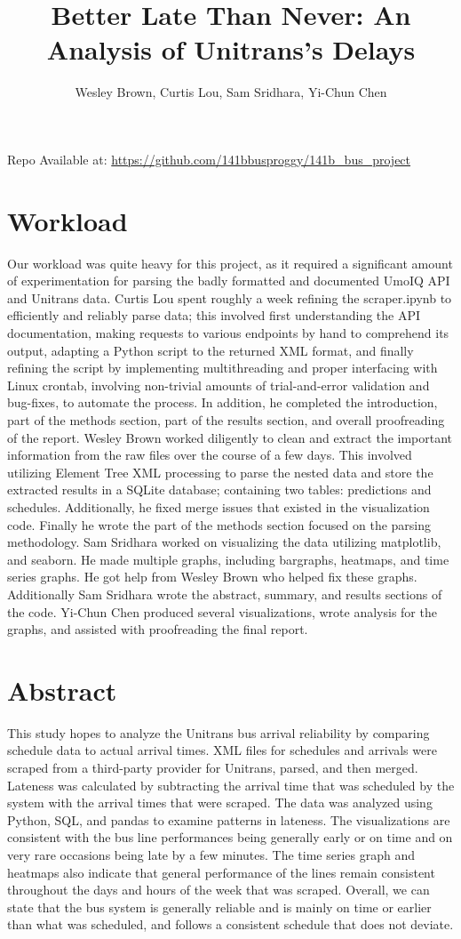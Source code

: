 \documentclass[]{article}
\title{Better Late Than Never: An Analysis of Unitrans's Delays}
\author{Wesley Brown, Curtis Lou, Sam Sridhara, Yi-Chun Chen}
\begin{document}
	\maketitle
	Repo Available at: \url{https://github.com/141bbusproggy/141b_bus_project}
	\pagebreak
	\section{Workload}
	Our workload was quite heavy for this project, as it required a significant amount of experimentation for parsing the badly formatted and documented UmoIQ API and Unitrans data. Curtis Lou spent roughly a week refining the scraper.ipynb to efficiently and reliably parse data; this involved first understanding the API documentation, making requests to various endpoints by hand to comprehend its output, adapting a Python script to the returned XML format, and finally refining the script by implementing multithreading and proper interfacing with Linux crontab, involving non-trivial amounts of trial-and-error validation and bug-fixes, to automate the process. In addition, he completed the introduction, part of the methods section, part of the results section, and overall  proofreading of the report. Wesley Brown worked diligently to clean and extract the important information from the raw files over the course of a few days. This involved utilizing Element Tree XML processing to parse the nested data and store the extracted results in a SQLite database; containing two tables: predictions and schedules. Additionally, he fixed merge issues that existed in the visualization code. Finally he wrote the part of the methods section focused on the parsing methodology. Sam Sridhara worked on visualizing the data utilizing matplotlib, and seaborn. He made multiple graphs, including bargraphs, heatmaps, and time series graphs. He got help from Wesley Brown who helped fix these graphs. Additionally Sam Sridhara wrote the abstract, summary, and results sections of the code. Yi-Chun Chen produced several visualizations, wrote analysis for the graphs, and assisted with proofreading the final report. 
	\section{Abstract}
	This study hopes to analyze the Unitrans bus arrival reliability by comparing schedule data to actual arrival times. XML files for schedules and arrivals were scraped from a third-party provider for Unitrans, parsed, and then merged. Lateness was calculated by subtracting the arrival time that was scheduled by the system with the arrival times that were scraped. The data was analyzed using Python, SQL, and pandas to examine patterns in lateness. The visualizations are consistent with the bus line performances being generally early or on time and on very rare occasions being late by a few minutes. The time series graph and heatmaps also indicate that general performance of the lines remain consistent throughout the days and hours of the week that was scraped. Overall, we can state that the bus system is generally reliable and is mainly on time or earlier than what was scheduled, and follows a consistent schedule that does not deviate.
\end{document}
